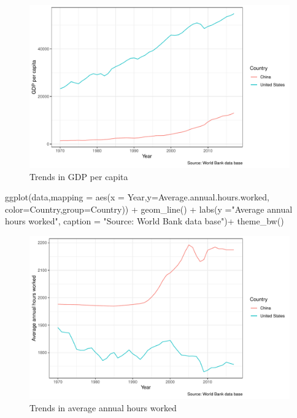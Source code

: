 \documentclass[11pt,a4paper,]{article}
\newenvironment{Shaded}{\begin{snugshade}}{\end{snugshade}}
\newcommand{\AttributeTok}[1]{\textcolor[rgb]{0.77,0.63,0.00}{#1}}
\newcommand{\FunctionTok}[1]{\textcolor[rgb]{0.00,0.00,0.00}{#1}}
\newcommand{\NormalTok}[1]{#1}
\newcommand{\SpecialCharTok}[1]{\textcolor[rgb]{0.00,0.00,0.00}{#1}}
\newcommand{\StringTok}[1]{\textcolor[rgb]{0.31,0.60,0.02}{#1}}
\begin{document}
\begin{figure}
\centering
\includegraphics{report_files/figure-latex/Figure1-1.pdf}
\caption{\label{fig:Figure1}Trends in GDP per capita}
\end{figure}

\begin{Shaded}
\begin{Highlighting}[]
\FunctionTok{ggplot}\NormalTok{(data,}\AttributeTok{mapping =} \FunctionTok{aes}\NormalTok{(}\AttributeTok{x =}\NormalTok{ Year,}\AttributeTok{y=}\NormalTok{Average.annual.hours.worked,}
                           \AttributeTok{color=}\NormalTok{Country,}\AttributeTok{group=}\NormalTok{Country)) }\SpecialCharTok{+}
  \FunctionTok{geom\_line}\NormalTok{() }\SpecialCharTok{+}
  \FunctionTok{labs}\NormalTok{(}\AttributeTok{y =}\StringTok{"Average annual hours worked"}\NormalTok{, }
       \AttributeTok{caption =} \StringTok{"Source: World Bank data base"}\NormalTok{)}\SpecialCharTok{+}
    \FunctionTok{theme\_bw}\NormalTok{()}
\end{Highlighting}
\end{Shaded}

\begin{figure}
\centering
\includegraphics{report_files/figure-latex/Figure2-1.pdf}
\caption{\label{fig:Figure2}Trends in average annual hours worked}
\end{figure}
\end{document}
